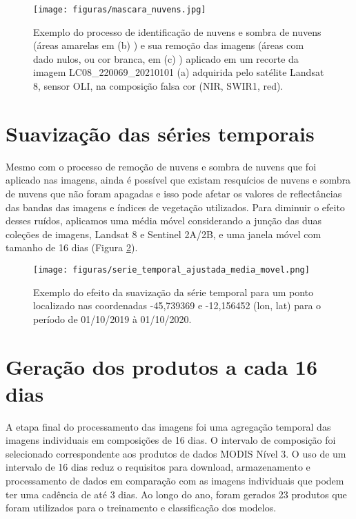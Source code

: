 \begin{figure}[H]
\caption{Exemplo do processo de identificação de nuvens e sombra de nuvens (áreas amarelas em (b) ) e sua remoção das imagens (áreas com dado nulos, ou cor branca, em (c) ) aplicado em um recorte da imagem LC08\_220069\_20210101 (a) adquirida pelo satélite Landsat 8, sensor OLI, na composição falsa cor (NIR, SWIR1, red).}
\label{fig:remocao_nuvens}
\centering
\texttt{[image: figuras/mascara\_nuvens.jpg]}
\end{figure}

\section{Suavização das séries temporais}
\label{sec:suavizacao_series_temporais}

Mesmo com o processo de remoção de nuvens e sombra de nuvens que foi aplicado nas imagens, ainda é possível que existam resquícios de nuvens e sombra de nuvens que não foram apagadas e isso pode afetar os valores de reflectâncias das bandas das imagens e índices de vegetação utilizados. Para diminuir o efeito desses ruídos, aplicamos uma média móvel considerando a junção das duas coleções de imagens, Landsat 8 e Sentinel 2A/2B, e uma janela móvel com tamanho de 16 dias (Figura \ref{fig:serie_ajustada_com_media_movel}).

\begin{figure}[H]
\caption{Exemplo do efeito da suavização da série temporal para um ponto localizado nas coordenadas -45,739369 e -12,156452 (lon, lat) para o período de 01/10/2019 à 01/10/2020. }
\label{fig:serie_ajustada_com_media_movel}
\centering
\texttt{[image: figuras/serie\_temporal\_ajustada\_media\_movel.png]}
\end{figure}

\section{Geração dos produtos a cada 16 dias}

A etapa final do processamento das imagens foi uma agregação temporal das imagens individuais em composições de 16 dias. O intervalo de composição foi selecionado correspondente aos produtos de dados MODIS Nível 3. O uso de um intervalo de 16 dias reduz o requisitos para download, armazenamento e processamento de dados em comparação com as imagens individuais que podem ter uma cadência de até 3 dias. Ao longo do ano, foram gerados 23 produtos que foram utilizados para o treinamento e classificação dos modelos. %

